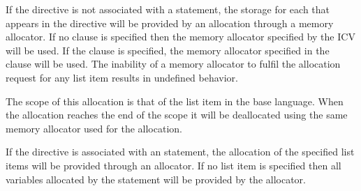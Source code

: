\descr

If the directive is not associated with a statement, the storage for each  that appears in the directive will be provided by an allocation through a memory allocator. If no clause is specified then the memory allocator specified by the  ICV will be used. If the  clause is specified, the memory allocator specified in the clause will be used. The inability of a memory allocator to fulfil the allocation request for any list item results in undefined behavior.

The scope of this allocation is that of the list item in the base language. When the allocation reaches the end of the scope it will be deallocated using the same memory allocator used for the allocation. %

\begin{fortranspecific}
If the directive is associated with an  statement, the allocation of the specified list items will be provided through an allocator. If no list item is specified then all variables allocated by the  statement will be provided by the allocator.
\end{fortranspecific}

